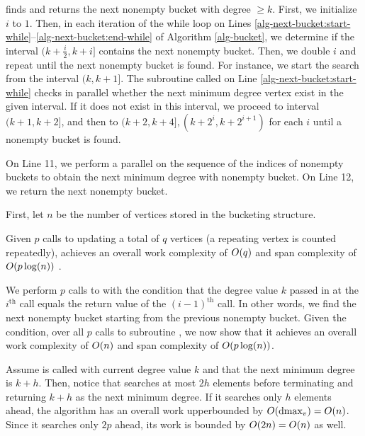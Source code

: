  finds and returns the next nonempty bucket with degree $\ge k$. First, we initialize $i$ to $1$. Then, in each iteration of the while loop on Lines \ref{alg-next-bucket:start-while}--\ref{alg-next-bucket:end-while} of Algorithm \ref{alg-bucket}, we determine if the interval $(k+\frac{i}{2},k+i]$ contains the next nonempty bucket. Then, we double $i$ and repeat until the next nonempty bucket is found. For instance,  we start the search from the interval $(k,k+1]$. The  subroutine called on Line \ref{alg-next-bucket:start-while} checks in parallel whether the next minimum degree vertex exist in the given interval. If it does not exist in this interval, we proceed to interval $(k+1,k+2]$, and then to $(k+2,k+4],(k + 2^i, k + 2^{i+1})$ for each $i$ until a nonempty bucket is found. 

On Line 11, we perform a parallel  on the sequence of the indices of nonempty buckets to obtain the next minimum degree with nonempty bucket. On Line 12, we return the next nonempty bucket.


First, let $n$ be the number of vertices stored in the bucketing structure. 

Given $p$ calls to  updating a total of $q$ vertices (a repeating vertex is counted repeatedly),  achieves an overall work complexity of $O(q)$ and span complexity of $O(p\log(n))$ \cite{DhBlSh17}.

We perform $p$ calls to  with the condition that the degree value $k$ passed in at the $i^\text{th}$ call equals the return value of the $(i-1)^\text{th}$ call. In other words, we find the next nonempty bucket starting from the previous nonempty bucket. Given the condition, over all $p$ calls to subroutine , we now show that it achieves an overall work complexity of $O(n)$ and span complexity of $O(p\log(n))$.

Assume  is called with current degree value $k$ and that the next minimum degree is $k+h$. Then, notice that  searches at most $2h$ elements before terminating and returning $k + h$ as the next minimum degree. If it searches only $h$ elements ahead, the algorithm has an overall work upperbounded by $O(\text{dmax}_v)=O(n)$. Since it searches only $2p$ ahead, its work is bounded by $O(2n)=O(n)$ as well.

